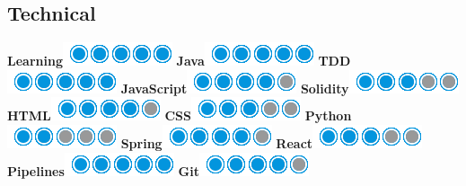 \documentclass[]{friggeri-cv}
\begin{document}
\begin{aside}
  \section{Technical}
  \hspace{1cm}
    \textbf{Learning}\includegraphics[scale=0.40]{img/5puces.png}
    \textbf{Java}\includegraphics[scale=0.40]{img/5puces.png}
    \textbf{TDD}\includegraphics[scale=0.40]{img/5puces.png}
    \textbf{JavaScript}\includegraphics[scale=0.40]{img/4puces.png}
    \textbf{Solidity}\includegraphics[scale=0.40]{img/3puces.png}
    \textbf{HTML}\includegraphics[scale=0.40]{img/4puces.png}
    \textbf{CSS}\includegraphics[scale=0.40]{img/3puces.png}
    \textbf{Python}\includegraphics[scale=0.40]{img/2puces.png}
    \textbf{Spring}\includegraphics[scale=0.40]{img/4puces.png}
    \textbf{React}\includegraphics[scale=0.40]{img/3puces.png}
    \textbf{Pipelines}\includegraphics[scale=0.40]{img/5puces.png}
    \textbf{Git}\includegraphics[scale=0.40]{img/4puces.png}

\end{aside}
\end{document}
